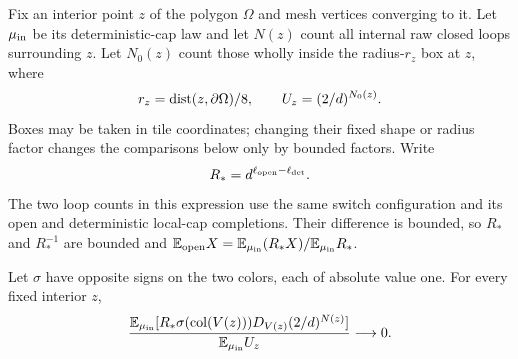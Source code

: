 Fix an interior point $z$ of the polygon $\Omega$ and mesh vertices
converging to it.  Let $\mu_{\rm in}$ be its deterministic-cap law and
let $N(z)$ count all internal raw closed loops surrounding $z$.
Let $N_0(z)$ count those wholly inside the radius-$r_z$ box at $z$,
where
\begin{equation}
 r_z=\operatorname{dist}(z,\partial\Omega)/8,\qquad
 U_z=(2/d)^{N_0(z)}.
 \label{obs:Uz}
\end{equation}
Boxes may be taken in tile coordinates; changing their fixed shape or
radius factor changes the comparisons below only by bounded factors.
Write
\begin{equation}
 R_*=d^{\ell_{\rm open}-\ell_{\rm det}}.
 \label{obs:open-density}
\end{equation}
The two loop counts in this expression use the same switch
configuration and its open and deterministic local-cap completions.
Their difference is bounded, so $R_*$ and $R_*^{-1}$ are bounded and
$\mathbb E_{\rm open}X=\mathbb E_{\mu_{\rm in}}(R_*X)/\mathbb E_{\mu_{\rm in}}R_*$.

\begin{theorem}
\label{thm:normalized-residual}
Let $\sigma$ have opposite signs on the two colors, each of absolute
value one.  For every fixed interior $z$,
\begin{equation}
 \frac{\mathbb E_{\mu_{\rm in}}
  [R_*\sigma(\operatorname{col}(V(z)))D_{V(z)}(2/d)^{N(z)}]}
 {\mathbb E_{\mu_{\rm in}}U_z}\longrightarrow0.
 \label{obs:normalized-residual}
\end{equation}
\end{theorem}


